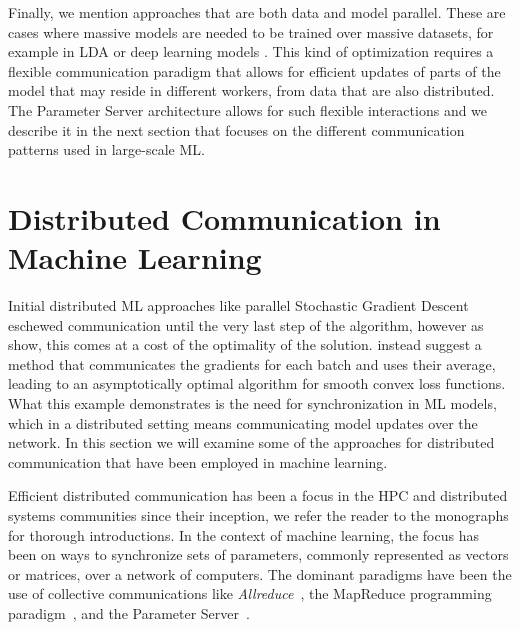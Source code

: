 Finally, we mention approaches that are both data and model parallel. These are
cases where massive models are needed to be trained over massive datasets, for
example in LDA or deep learning models \cite{large-scale-dl, lightLDA}. This kind of
optimization requires a flexible communication paradigm that allows for efficient
updates of parts of the model that may reside in different workers, from data
that are also distributed. The Parameter Server architecture\cite{muPS}
allows for such flexible interactions and we describe it in the next
section that focuses on the different communication patterns used
in large-scale ML.

\section{Distributed Communication in Machine Learning}
\label{sec:bg-ml-communication}

Initial distributed ML approaches like parallel Stochastic Gradient Descent
\cite{parallel-sgd} eschewed communication until the very last step of the
algorithm, however as \citet{dekel-optimal-distributed} show, this comes
at a cost of the optimality of the solution. \citet{dekel-optimal-distributed}
instead suggest a method that communicates the gradients for each batch and uses
their average, leading to an asymptotically optimal algorithm for smooth
convex loss functions. What this example demonstrates is the need for synchronization
in ML models, which in a distributed setting means communicating model updates
over the network. In this section we will examine some of the approaches for distributed
communication that have been employed in machine learning.

Efficient distributed communication has been a focus in the HPC and distributed systems
communities since their inception, we refer the reader to the monographs
\cite{hpc-intro, distributed-systems-book, distributed-systems-programming, distributed-systems-computation} for thorough introductions.
In the context of machine learning, the focus has been on ways to synchronize
sets of parameters, commonly represented as vectors or matrices, over a network
of computers. The dominant paradigms have been the use of collective communications
like \emph{Allreduce}~\cite{allreduce}, the MapReduce programming paradigm~\cite{mapreduce},
and the Parameter Server~\cite{muPS}.

